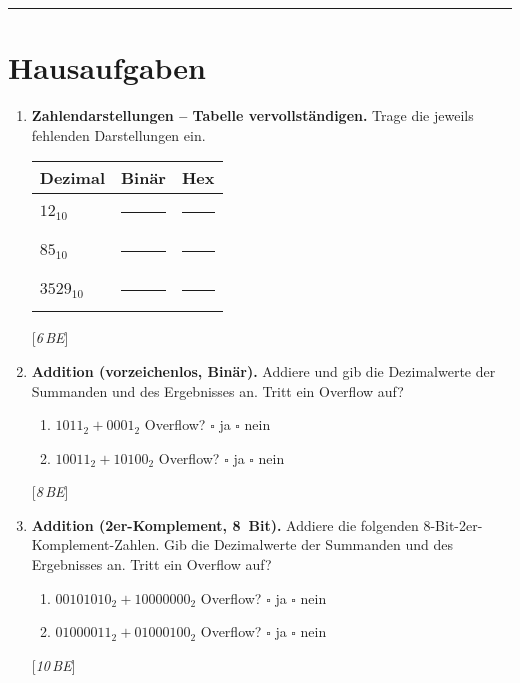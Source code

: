 \documentclass[11pt,a4paper]{scrartcl}
\newenvironment{aufgaben}{%
  \begin{enumerate}[leftmargin=*,label=\textbf{Aufgabe~\arabic*:}, itemsep=0.6em]
}{\end{enumerate}}
\newcommand{\punkte}[1]{\hfill{\small[\textit{#1\,BE}]}}
\begin{document}
\vspace{0.3em}
\hrule
\vspace{0.6em}

\section*{Hausaufgaben}

\begin{aufgaben}
  \item \textbf{Zahlendarstellungen – Tabelle vervollständigen.} Trage die jeweils fehlenden Darstellungen ein.
  \vspace{0.3em}

  \renewcommand{\arraystretch}{1.2}
  \begin{tabularx}{\linewidth}{|>{\raggedright\arraybackslash}X|>{\raggedright\arraybackslash}X|>{\raggedright\arraybackslash}X|}
    \hline
    \textbf{Dezimal} & \textbf{Binär} & \textbf{Hex} \\ \hline
    \(12_{10}\)  & \rule{4.5cm}{0.4pt} & \rule{3.0cm}{0.4pt} \\ \hline
    \(85_{10}\)  & \rule{4.5cm}{0.4pt} & \rule{3.0cm}{0.4pt} \\ \hline
    \(3529_{10}\)& \rule{4.5cm}{0.4pt} & \rule{3.0cm}{0.4pt} \\ \hline
  \end{tabularx}
  \punkte{6}

  \item \textbf{Addition (vorzeichenlos, Binär).} Addiere und gib die Dezimalwerte der Summanden und des Ergebnisses an. Tritt ein Overflow auf?
  \begin{enumerate}[label*=\alph*)]
    \item \(1011_2 + 0001_2\) \quad Overflow? \(\square\) ja \(\square\) nein
    \item \(10011_2 + 10100_2\) \quad Overflow? \(\square\) ja \(\square\) nein
  \end{enumerate}
  \punkte{8}

  \item \textbf{Addition (2er-Komplement, 8~Bit).} Addiere die folgenden 8-Bit-2er-Komplement-Zahlen. Gib die Dezimalwerte der Summanden und des Ergebnisses an. Tritt ein Overflow auf?
  \begin{enumerate}[label*=\alph*)]
    \item \(00101010_2 + 10000000_2\) \quad Overflow? \(\square\) ja \(\square\) nein
    \item \(01000011_2 + 01000100_2\) \quad Overflow? \(\square\) ja \(\square\) nein
  \end{enumerate}
  \punkte{10}


\end{aufgaben}
\end{document}
